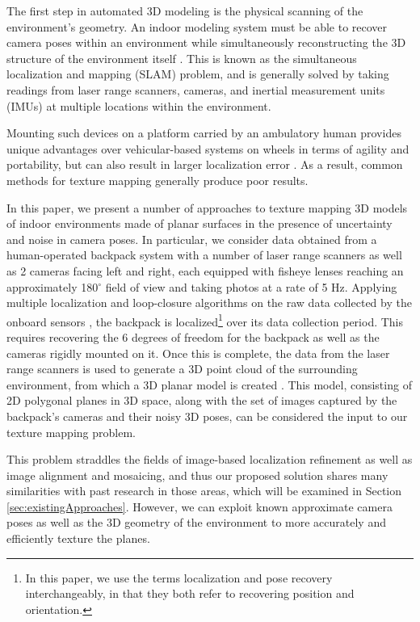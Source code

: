 \documentclass[10pt,twocolumn,letterpaper]{article}
\begin{document}
The first step in automated 3D modeling is the physical scanning of
the environment's geometry. An indoor modeling system must be able to
recover camera poses within an environment while simultaneously
reconstructing the 3D structure of the environment itself
\cite{chen2010indoor, hz, kua2012loopclosure, liu2010indoor}. This is
known as the simultaneous localization and mapping (SLAM) problem, and
is generally solved by taking readings from laser range scanners,
cameras, and inertial measurement units (IMUs) at multiple locations
within the environment.

Mounting such devices on a platform carried by an ambulatory human
provides unique advantages over vehicular-based systems on wheels in
terms of agility and portability, but can also result in larger
localization error \cite{liu2010indoor}. As a result, common methods
for texture mapping generally produce poor results.

In this paper, we present a number of approaches to texture mapping 3D
models of indoor environments made of planar surfaces in the presence
of uncertainty and noise in camera poses. In particular, we consider
data obtained from a human-operated backpack system with a number of
laser range scanners as well as 2 cameras facing left and right, each
equipped with fisheye lenses reaching an approximately 180$^{\circ}$
field of view and taking photos at a rate of 5 Hz. Applying multiple
localization and loop-closure algorithms on the raw data collected by
the onboard sensors \cite{chen2010indoor, kua2012loopclosure,
  liu2010indoor}, the backpack is localized\footnote{In this paper, we
  use the terms localization and pose recovery interchangeably, in
  that they both refer to recovering position and orientation.}  over
its data collection period. This requires recovering the 6 degrees of
freedom for the backpack as well as the cameras rigidly mounted on
it. Once this is complete, the data from the laser range scanners is
used to generate a 3D point cloud of the surrounding environment, from which a
3D planar model is created \cite{sanchez2012point}. This model, consisting of 2D
polygonal planes in 3D space, along with the set of images captured by
the backpack's cameras and their noisy 3D poses, can be considered the
input to our texture mapping problem.

This problem straddles the fields of image-based localization
refinement as well as image alignment and mosaicing, and thus our
proposed solution shares many similarities with past research in those
areas, which will be examined in Section
\ref{sec:existingApproaches}. However, we can exploit known
approximate camera poses as well as the 3D geometry of the environment
to more accurately and efficiently texture the planes.
\end{document}

